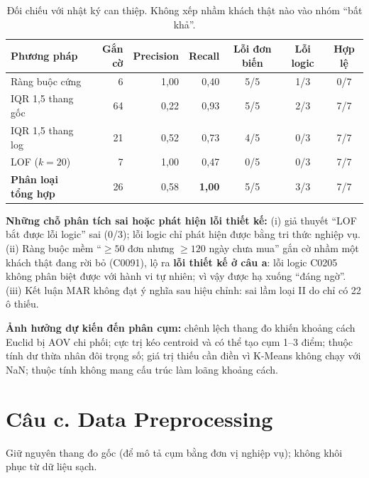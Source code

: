 \documentclass[12pt,a4paper]{article}
\begin{document}
\begin{table}[H]\centering\small
\begin{tabular}{@{}lrrrccc@{}}\toprule
Phương pháp & Gắn cờ & Precision & Recall & Lỗi đơn biến & Lỗi logic & Hợp lệ\\\midrule
Ràng buộc cứng & 6 & 1,00 & 0,40 & 5/5 & 1/3 & 0/7\\
IQR 1,5 thang gốc & 64 & 0,22 & 0,93 & 5/5 & 2/3 & 7/7\\
IQR 1,5 thang log & 21 & 0,52 & 0,73 & 4/5 & 0/3 & 7/7\\
LOF ($k = 20$) & 7 & 1,00 & 0,47 & 0/5 & 0/3 & 7/7\\
\textbf{Phân loại tổng hợp} & 26 & 0,58 & \textbf{1,00} & 5/5 & 3/3 & 7/7\\\bottomrule
\end{tabular}
\caption{Đối chiếu với nhật ký can thiệp. Không xếp nhầm khách thật nào vào nhóm ``bất khả''.}
\end{table}

\textbf{Những chỗ phân tích sai hoặc phát hiện lỗi thiết kế:} (i) giả thuyết ``LOF bắt được lỗi logic'' sai (0/3); lỗi logic chỉ phát hiện được bằng tri thức nghiệp vụ. (ii) Ràng buộc mềm ``$\ge 50$ đơn nhưng $\ge 120$ ngày chưa mua'' gắn cờ nhầm một khách thật đang rời bỏ (C0091), lộ ra \textbf{lỗi thiết kế ở câu a}: lỗi logic C0205 không phân biệt được với hành vi tự nhiên; vì vậy được hạ xuống ``đáng ngờ''. (iii) Kết luận MAR không đạt ý nghĩa sau hiệu chỉnh: sai lầm loại II do chỉ có 22 ô thiếu.

\textbf{Ảnh hưởng dự kiến đến phân cụm:} chênh lệch thang đo khiến khoảng cách Euclid bị AOV chi phối; cực trị kéo centroid và có thể tạo cụm 1--3 điểm; thuộc tính dư thừa nhân đôi trọng số; giá trị thiếu cần điền vì K-Means không chạy với NaN; thuộc tính không mang cấu trúc làm loãng khoảng cách.

\section{Câu c. Data Preprocessing}
Giữ nguyên thang đo gốc (để mô tả cụm bằng đơn vị nghiệp vụ); không khôi phục từ dữ liệu sạch.
\end{document}
